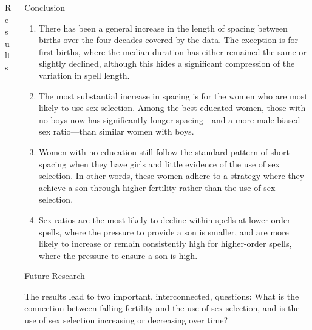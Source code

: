 \documentclass[final]{beamer}
\newlength{\onecolwid}
\newlength{\twocolwid}
\begin{document}
\begin{frame}{}
\begin{columns}[t]
\begin{column}{\twocolwid}
\begin{block}{Results}
    \end{block}
    

\end{column}


\begin{column}{\onecolwid}

\begin{alertblock}{Conclusion}

\begin{enumerate}
\item There has been a general increase in the length of spacing between births
over the four decades covered by the data.
The exception is for first births, where the median duration has either
remained the same or slightly declined, although this hides a
significant compression of the variation in spell length.

\item The most substantial increase in spacing is for the women who
are most likely to use sex selection.
Among the best-educated women, those with no boys now has 
significantly longer spacing---and a more male-biased sex ratio---than 
similar women with boys.

\item Women with no education still follow the standard pattern of
short spacing when they have girls and little evidence of the use of sex
selection.
In other words, these women adhere to a strategy where they achieve a
son through higher fertility rather than the use of sex selection.

\item Sex ratios are the most likely to decline within spells at
lower-order spells, where the pressure to provide a son is smaller, and
are more likely to increase or remain consistently high for higher-order
spells, where the pressure to ensure a son is high.

\end{enumerate}

\end{alertblock}

\begin{block}{Future Research}

The results lead to two important, interconnected, questions:
What is the connection between falling fertility and the 
use of sex selection, and is the use of sex selection increasing 
or decreasing over time?


\end{block}
\end{column}
\end{columns}
\end{frame}
\end{document}
